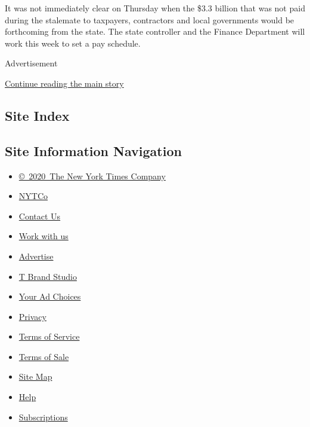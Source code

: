 It was not immediately clear on Thursday when the \$3.3 billion that was
not paid during the stalemate to taxpayers, contractors and local
governments would be forthcoming from the state. The state controller
and the Finance Department will work this week to set a pay schedule.

Advertisement

\protect\hyperlink{after-bottom}{Continue reading the main story}

\hypertarget{site-index}{%
\subsection{Site Index}\label{site-index}}

\hypertarget{site-information-navigation}{%
\subsection{Site Information
Navigation}\label{site-information-navigation}}

\begin{itemize}
\tightlist
\item
  \href{https://help.nytimes.com/hc/en-us/articles/115014792127-Copyright-notice}{©~2020~The
  New York Times Company}
\end{itemize}

\begin{itemize}
\tightlist
\item
  \href{https://www.nytco.com/}{NYTCo}
\item
  \href{https://help.nytimes.com/hc/en-us/articles/115015385887-Contact-Us}{Contact
  Us}
\item
  \href{https://www.nytco.com/careers/}{Work with us}
\item
  \href{https://nytmediakit.com/}{Advertise}
\item
  \href{http://www.tbrandstudio.com/}{T Brand Studio}
\item
  \href{https://www.nytimes.com/privacy/cookie-policy\#how-do-i-manage-trackers}{Your
  Ad Choices}
\item
  \href{https://www.nytimes.com/privacy}{Privacy}
\item
  \href{https://help.nytimes.com/hc/en-us/articles/115014893428-Terms-of-service}{Terms
  of Service}
\item
  \href{https://help.nytimes.com/hc/en-us/articles/115014893968-Terms-of-sale}{Terms
  of Sale}
\item
  \href{https://spiderbites.nytimes.com}{Site Map}
\item
  \href{https://help.nytimes.com/hc/en-us}{Help}
\item
  \href{https://www.nytimes.com/subscription?campaignId=37WXW}{Subscriptions}
\end{itemize}
